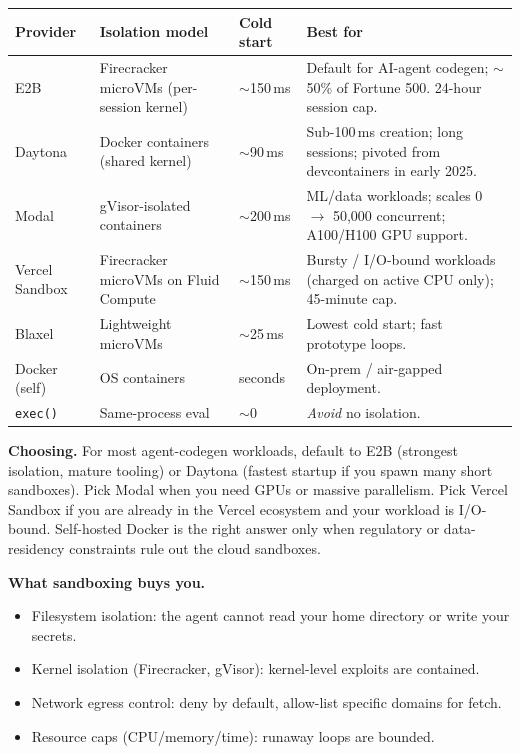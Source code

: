 \documentclass[a4paper,11pt]{article}
\begin{document}
\begin{center}\small
\begin{tabular}{p{2.6cm} p{4cm} p{3cm} p{3cm}}
  \toprule
  \textbf{Provider} & \textbf{Isolation model} & \textbf{Cold start} & \textbf{Best for} \\
  \midrule
  E2B           & Firecracker microVMs (per-session kernel) & $\sim$150\,ms & Default for AI-agent codegen; $\sim$50\% of Fortune 500. 24-hour session cap. \\
  Daytona       & Docker containers (shared kernel)         & $\sim$90\,ms  & Sub-100\,ms creation; long sessions; pivoted from devcontainers in early 2025. \\
  Modal         & gVisor-isolated containers                & $\sim$200\,ms & ML/data workloads; scales 0 $\to$ 50{,}000 concurrent; A100/H100 GPU support. \\
  Vercel Sandbox& Firecracker microVMs on Fluid Compute     & $\sim$150\,ms & Bursty / I/O-bound workloads (charged on active CPU only); 45-minute cap. \\
  Blaxel        & Lightweight microVMs                       & $\sim$25\,ms  & Lowest cold start; fast prototype loops. \\
  Docker (self) & OS containers                              & seconds       & On-prem / air-gapped deployment. \\
  \texttt{exec()}& Same-process eval                         & $\sim$0       & \textit{Avoid} \textemdash{} no isolation. \\
  \bottomrule
\end{tabular}
\end{center}

\textbf{Choosing.} For most agent-codegen workloads, default to E2B
(strongest isolation, mature tooling) or Daytona (fastest startup if
you spawn many short sandboxes). Pick Modal when you need GPUs or
massive parallelism. Pick Vercel Sandbox if you are already in the
Vercel ecosystem and your workload is I/O-bound. Self-hosted Docker
is the right answer only when regulatory or data-residency
constraints rule out the cloud sandboxes.

\textbf{What sandboxing buys you.}
\begin{itemize}[noitemsep, leftmargin=1.2em]
  \item Filesystem isolation: the agent cannot read your home
        directory or write your secrets.
  \item Kernel isolation (Firecracker, gVisor): kernel-level exploits
        are contained.
  \item Network egress control: deny by default, allow-list specific
        domains for fetch.
  \item Resource caps (CPU/memory/time): runaway loops are bounded.
\end{itemize}
\end{document}
